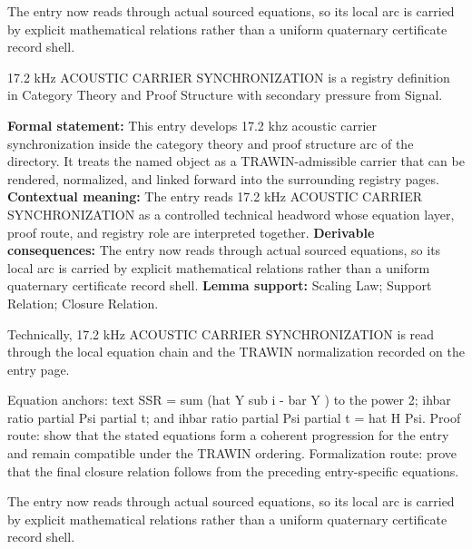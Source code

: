 The entry now reads through actual sourced equations, so its local arc is carried by explicit mathematical relations rather than a uniform quaternary certificate record shell.
\clearpage


\begingroup\small
{}
17.2 kHz ACOUSTIC CARRIER SYNCHRONIZATION is a registry definition in Category Theory and Proof Structure with secondary pressure from Signal.

\begingroup\footnotesize\setlength{\emergencystretch}{3em}\sloppy
\textbf{Formal statement:} This entry develops 17.2 khz acoustic carrier synchronization inside the category theory and proof structure arc of the directory. It treats the named object as a TRAWIN-admissible carrier that can be rendered, normalized, and linked forward into the surrounding registry pages. \textbf{Contextual meaning:} The entry reads 17.2 kHz ACOUSTIC CARRIER SYNCHRONIZATION as a controlled technical headword whose equation layer, proof route, and registry role are interpreted together. \textbf{Derivable consequences:} The entry now reads through actual sourced equations, so its local arc is carried by explicit mathematical relations rather than a uniform quaternary certificate record shell. \textbf{Lemma support:} Scaling Law; Support Relation; Closure Relation.\par
\endgroup

Technically, 17.2 kHz ACOUSTIC CARRIER SYNCHRONIZATION is read through the local equation chain and the TRAWIN normalization recorded on the entry page.

Equation anchors: text SSR = sum (hat Y sub i - bar Y ) to the power 2; ihbar ratio partial Psi partial t; and ihbar ratio partial Psi partial t = hat H Psi. Proof route: show that the stated equations form a coherent progression for the entry and remain compatible under the TRAWIN ordering. Formalization route: prove that the final closure relation follows from the preceding entry-specific equations.

The entry now reads through actual sourced equations, so its local arc is carried by explicit mathematical relations rather than a uniform quaternary certificate record shell.
\endgroup

